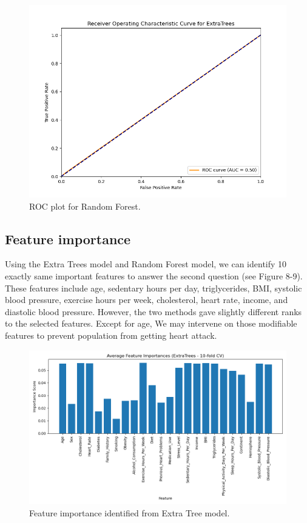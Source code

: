 \documentclass{article}
\begin{document}
\begin{figure}
\centering
\includegraphics[width=0.6\linewidth]{figures/receiver_operating_characteristic_curve_for_extratrees.png}
\caption{\label{fig:ROC2} ROC plot for Random Forest.}
\end{figure}

\subsection{Feature importance}
Using the Extra Trees model and Random Forest model, we can identify 10 exactly same important features to answer the second question (see Figure 8-9). These features include age, sedentary hours per day, triglycerides, BMI, systolic blood pressure, exercise hours per week, cholesterol, heart rate, income, and diastolic blood pressure. However, the two methods gave slightly different ranks to the selected features. Except for age, We may intervene on those modifiable features to prevent population from getting heart attack.

\begin{figure}
\centering
\includegraphics[width=1\linewidth]{figures/average_feature_importances_(extratrees_-_10-fold_cv).png}
\caption{\label{fig:FI_Ext} Feature importance identified from Extra Tree model.}
\end{figure}
\end{document}
